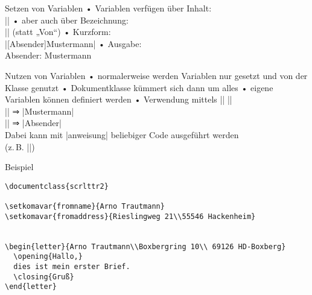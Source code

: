 \begin{frame}[fragile]{Setzen von Variablen}
• Variablen verfügen über \alert{Inhalt}:\\%
||
• aber auch über \alert{Bezeichnung}:\\%
|| (statt „Von“)
• Kurzform:\\%
|[Absender]{Mustermann}|
• Ausgabe:\\%
Absender: Mustermann
\•
\end{frame}

\begin{frame}[fragile]{Nutzen von Variablen}
• normalerweise werden Variablen nur gesetzt und von der Klasse genutzt
• Dokumentklasse kümmert sich dann um alles
• eigene Variablen können definiert werden
• Verwendung mittels |\usekomavar|
\•
||\\
|| ⇒ |Mustermann|\\
|| ⇒ |Absender|\\
Dabei kann mit |anweisung| beliebiger Code ausgeführt werden\\
(z.\,B. |\MakeUppercase|)
\end{frame}

\begin{frame}[fragile]{Beispiel}
\begin{verbatim}
\documentclass{scrlttr2}

\setkomavar{fromname}{Arno Trautmann}
\setkomavar{fromaddress}{Rieslingweg 21\\55546 Hackenheim}


\begin{letter}{Arno Trautmann\\Boxbergring 10\\ 69126 HD-Boxberg}
  \opening{Hallo,}
  dies ist mein erster Brief.
  \closing{Gruß}
\end{letter}


\end{verbatim}
\end{frame}


